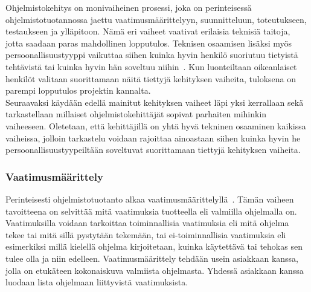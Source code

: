 \documentclass[finnish]{../tktltiki2}
\theoremstyle{definition}
\theoremstyle{remark}
\begin{document}
Ohjelmistokehitys on monivaiheinen prosessi, joka on perinteisessä ohjelmistotuotannossa
jaettu vaatimusmäärittelyyn, suunnitteluun, toteutukseen, testaukseen
ja ylläpitoon. Nämä eri vaiheet vaativat erilaisia teknisiä taitoja,
jotta saadaan paras mahdollinen lopputulos. Teknisen
osaamisen lisäksi myös persoonallisuustyyppi vaikuttaa siihen kuinka
hyvin henkilö suoriutuu tietyistä tehtävistä tai kuinka hyvin hän
soveltuu niihin~\cite{Capretz:2010:MSS:1726559.1726574}. Kun luonteiltaan oikeanlaiset henkilöt valitaan suorittamaan
näitä tiettyjä kehityksen vaiheita, tuloksena on parempi lopputulos
projektin kannalta.\\

Seuraavaksi käydään edellä mainitut kehityksen vaiheet läpi yksi kerrallaan
sekä tarkastellaan millaiset ohjelmistokehittäjät sopivat
parhaiten mihinkin vaiheeseen. Oletetaan, että kehittäjillä on
yhtä hyvä tekninen osaaminen kaikissa vaiheissa, jolloin tarkastelu
voidaan rajoittaa ainoastaan siihen kuinka hyvin he persoonallisuustyypeiltään soveltuvat suorittamaan tiettyjä
kehityksen vaiheita.

\subsubsection{Vaatimusmäärittely}

Perinteisesti ohjelmistotuotanto alkaa vaatimusmäärittelyllä~\cite{SWEBOK:409902,Sommerville:2005:IRE:1042197.1042341}. Tämän vaiheen tavoitteena on selvittää mitä vaatimuksia
tuotteella eli valmiilla ohjelmalla on. Vaatimuksilla voidaan tarkoittaa toiminnallisia vaatimuksia eli
mitä ohjelma tekee tai mitä sillä pystytään tekemään, tai ei-toiminnallisia vaatimuksia eli esimerkiksi millä kielellä
ohjelma kirjoitetaan, kuinka käytettävä tai tehokas sen tulee olla ja niin edelleen. Vaatimusmäärittely tehdään usein asiakkaan kanssa, jolla on etukäteen kokonaiskuva valmiista ohjelmasta. Yhdessä asiakkaan kanssa luodaan lista ohjelmaan liittyvistä vaatimuksista.\\

\enlargethispage{\baselineskip}
\end{document}
